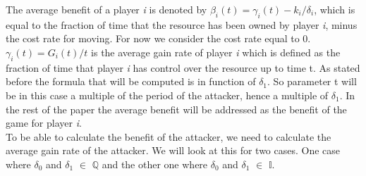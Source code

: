 The average benefit of a player \textit{i} is denoted by $\beta_{i}(t) = \gamma_{i}(t) - k_{i} / \delta_{i}$, which is equal to the fraction of time that the resource has been owned by player \textit{i}, minus the cost rate for moving. For now we consider the cost rate equal to 0. $\gamma_{i}(t) = G_{i}(t)/t$ is the average gain rate of player \textit{i} which is defined as the fraction of time that player \textit{i} has control over the resource up to time t.
As stated before the formula that will be computed is in function of $\delta_{1}$. So parameter t will be in this case a multiple of the period of the attacker, hence a multiple of $\delta_{1}$. In the rest of the paper the average benefit will be addressed as the benefit of the game for player \textit{i}. \\

To be able to calculate the benefit of the attacker, we need to calculate the average gain rate of the attacker. We will look at this for two cases. One case where $\delta_{0}$ and $\delta_{1}$ $\in$ \(\mathbb{Q}\) and the other one where $\delta_{0}$ and $\delta_{1}$ $\in$ \(\mathbb{I}.\) \\

